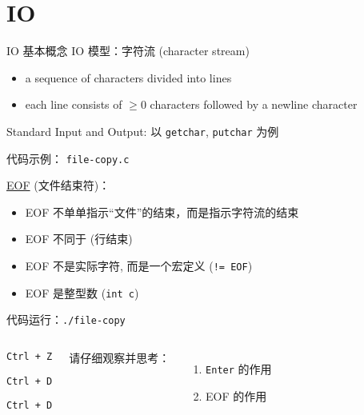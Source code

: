 \section{IO}

\begin{frame}{IO 基本概念}
  IO 模型：字符流 (character stream)
  \begin{itemize}
    \item a sequence of characters divided into lines
    \item each line consists of $\ge 0$ characters followed by a newline character 
  \end{itemize}
\end{frame}

\begin{frame}{Standard Input and Output: 以 \texttt{getchar}, \texttt{putchar} 为例}
  \centerline{代码示例： \texttt{file-copy.c}}

  \vspace{0.50cm}
  \pause
  \href{http://www.cplusplus.com/reference/cstdio/EOF/}{EOF} (文件结束符)：
  \begin{itemize}
    \item EOF 不单单指示``文件''的结束，而是指示字符流的结束
    \item EOF 不同于 (行结束)
    \item EOF 不是实际字符, 而是一个宏定义 (\texttt{!= EOF})
    \item EOF 是整型数 (\texttt{int c}) 
  \end{itemize}

  \pause
  \vspace{0.50cm}
  \centerline{代码运行：\texttt{./file-copy}}

  \pause
  \begin{columns}[c]
      \begin{description}[Windows]
	\item[Windows] \texttt{Ctrl + Z}
	\item[Linux] \texttt{Ctrl + D}
	\item[Mac] \texttt{Ctrl + D}
      \end{description}
      请仔细观察并思考：
      \begin{enumerate}
	\item \texttt{Enter} 的作用
	\item EOF 的作用
      \end{enumerate}
  \end{columns}
\end{frame}

